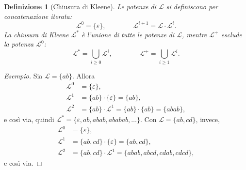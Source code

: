\documentclass[a4paper, 11pt, oneside]{book}
\theoremstyle{formale}
\newtheorem*{definition}{Definizione}
\newenvironment{esempio}
    {\begin{proof}[\textit{Esempio}]\renewcommand{\qedsymbol}{$\diamond$}}
    {\end{proof}}
\begin{document}
    \begin{definition}[Chiusura di Kleene]
        Le \emph{potenze} di $\mathcal{L}$ si definiscono per concatenazione iterata:
        \begin{equation*}
            \mathcal{L}^0 = \{\varepsilon\},
            \qquad\qquad
            \mathcal{L}^{i+1} = \mathcal{L} \cdot \mathcal{L}^i.
        \end{equation*}
        La \emph{chiusura di Kleene} $\mathcal{L}^*$ \`e l'unione di tutte le potenze di
        $\mathcal{L}$, mentre $\mathcal{L}^+$ esclude la potenza $\mathcal{L}^0$:
        \begin{equation*}
            \mathcal{L}^* = \bigcup_{i \geq 0} \mathcal{L}^i,
            \qquad\qquad
            \mathcal{L}^+ = \bigcup_{i \geq 1} \mathcal{L}^i.
        \end{equation*}
    \end{definition}

    \begin{esempio}
        Sia $\mathcal{L} = \{ab\}$. Allora
        \begin{align*}
            \mathcal{L}^0 &= \{\varepsilon\}, \\
            \mathcal{L}^1 &= \{ab\} \cdot \{\varepsilon\} = \{ab\}, \\
            \mathcal{L}^2 &= \{ab\} \cdot \mathcal{L}^1 = \{ab\} \cdot \{ab\} = \{abab\},
        \end{align*}
        e cos\`i via, quindi $\mathcal{L}^* = \{\varepsilon, ab, abab, ababab, \dots\}$.
        Con $\mathcal{L} = \{ab, cd\}$, invece,
        \begin{align*}
            \mathcal{L}^0 &= \{\varepsilon\}, \\
            \mathcal{L}^1 &= \{ab, cd\} \cdot \{\varepsilon\} = \{ab, cd\}, \\
            \mathcal{L}^2 &= \{ab, cd\} \cdot \mathcal{L}^1
                = \{abab, abcd, cdab, cdcd\},
        \end{align*}
        e cos\`i via.
    \end{esempio}
\end{document}
